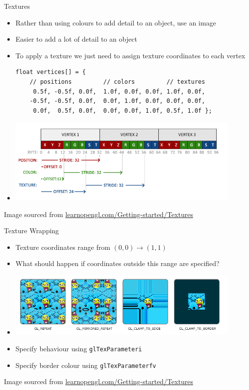\documentclass{beamer}
\begin{document}
\begin{frame}[fragile]{Textures}
    \begin{itemize}
        \item Rather than using colours to add detail to an object, use an image
        \item Easier to add a lot of detail to an object
        \item To apply a texture we just need to assign texture coordinates to each vertex
\footnotesize{
\begin{verbatim}
float vertices[] = {
    // positions         // colors         // textures
     0.5f, -0.5f, 0.0f,  1.0f, 0.0f, 0.0f, 1.0f, 0.0f, 
    -0.5f, -0.5f, 0.0f,  0.0f, 1.0f, 0.0f, 0.0f, 0.0f, 
     0.0f,  0.5f, 0.0f,  0.0f, 0.0f, 1.0f, 0.5f, 1.0f };
\end{verbatim}
}
        \item[] \includegraphics[width=0.90\textwidth]{images/vertex_attribute_pointer_interleaved_textures.png}
    \end{itemize}
    \vfill{}
    {\footnotesize{Image sourced from \url{learnopengl.com/Getting-started/Textures}}}
\end{frame}

\begin{frame}[fragile]{Texture Wrapping}
    \begin{itemize}
        \item Texture coordinates range from $\left(0, 0\right) \to \left(1, 1\right)$
        \item What should happen if coordinates outside this range are specified?
        \item[] \includegraphics[width=0.90\textwidth]{images/texture_wrapping.png}
        \item Specify behaviour using {\color{blue}\verb"glTexParameteri"}
        \item Specify border colour using {\color{blue}\verb"glTexParameterfv"}
    \end{itemize}
    \vfill{}
    {\footnotesize{Image sourced from \url{learnopengl.com/Getting-started/Textures}}}
\end{frame}
\end{document}
